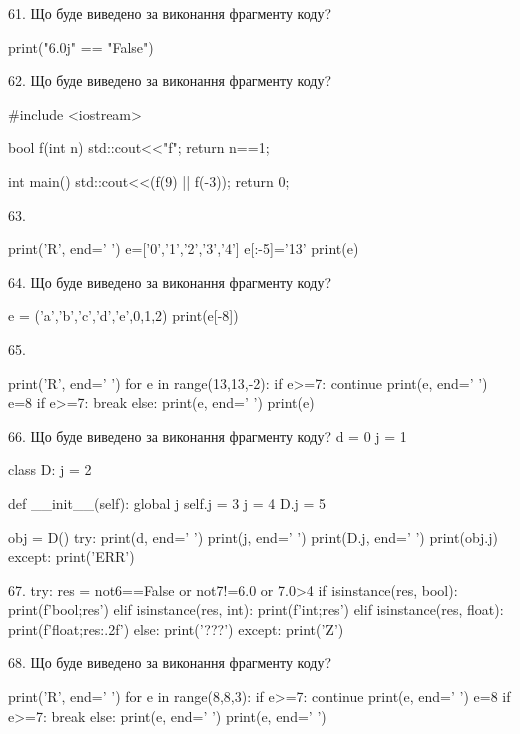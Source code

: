 \documentclass[11pt]{article}
\begin{document}

61. Що буде виведено за виконання фрагменту коду?

print("6.0j" == "False")


62. Що буде виведено за виконання фрагменту коду?

#include <iostream>

bool f(int n){
    std::cout<<"f";
    return n==1;
}

int main(){
    std::cout<<(f(9) || f(-3));
    return 0;
}


63. 

print('R', end=' ')
e=['0','1','2','3','4']
e[:-5]='13'
print(e)



64. Що буде виведено за виконання фрагменту коду?

e = ('a','b','c','d','e',0,1,2)
print(e[-8])



65. 

print('R', end=' ')
for e in range(13,13,-2):
    if e>=7:
        continue
        print(e, end=' ')
        e=8
    if e>=7:
        break
    else:
        print(e, end=' ')
    print(e)


66. Що буде виведено за виконання фрагменту коду?
d = 0
j = 1

class D:
    j = 2
    
    def __init__(self):
global j        self.j = 3
        j = 4
        D.j = 5

obj = D()
try:
    print(d, end=' ')
    print(j, end=' ')
    print(D.j, end=' ')
    print(obj.j)
except:
    print('ERR')


67. 
try:
    res = not6==False or not7!=6.0 or 7.0>4
    if isinstance(res, bool):
        print(f'bool;{res}')
    elif isinstance(res, int):
        print(f'int;{res}')
    elif isinstance(res, float):
        print(f'float;{res:.2f}')
    else:
        print('???')
except:
    print('Z')


68. Що буде виведено за виконання фрагменту коду?

print('R', end=' ')
for e in range(8,8,3):
    if e>=7:
        continue
        print(e, end=' ')
        e=8
    if e>=7:
        break
    else:
        print(e, end=' ')
    print(e, end=' ')
\end{document}
